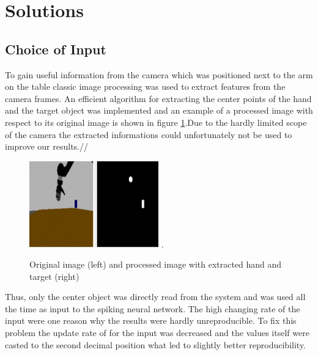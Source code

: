 \section{Solutions}
\subsection{Choice of Input}

To gain useful information from the camera which was positioned next to the arm on the table classic image processing was used to extract features from the camera frames. An efficient algorithm for extracting the center points of the hand and the target object was implemented and an example of a processed image with respect to its original image is shown in figure \ref{processed_pic}.Due to the hardly limited scope of the camera the extracted informations could unfortunately not be used to improve our results.//

\begin{figure}[H]
	\centering
	\includegraphics[width=2.2in]{img/image_processing.png}
	\DeclareGraphicsExtensions.
	\caption{Original image (left) and processed image with extracted hand and target (right)}
	\label{processed_pic}
\end{figure}

Thus, only the center object was directly read from the system and was used all the time as input to the spiking neural network. The high changing rate of the input were one reason why the results were hardly unreproducible. To fix this problem the update rate of for the input was decreased and the values itself were casted to the second decimal position what led to slightly better reproducibility. 

